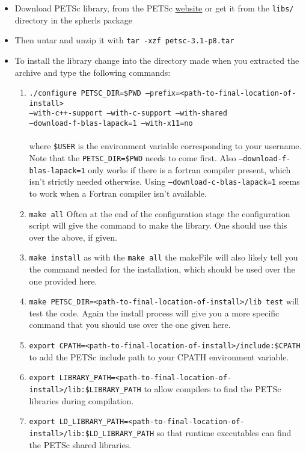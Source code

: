 \documentclass[12pt,a4paper]{book}
\begin{document}
\begin{itemize}
\item Download PETSc library, from the PETSc \href{http://www.mcs.anl.gov/petsc/download/index.html}{website} or get it from the {\tt libs/} directory in the spherls package
\item Then untar and unzip it with {\tt tar -xzf petsc-3.1-p8.tar}
\item To install the library change into the directory made when you extracted the archive and type the following commands:
\begin{enumerate}
\item {\tt ./configure PETSC\_DIR=\$PWD --prefix=<path-to-final-location-of-install> }\\{\tt --with-c++-support --with-c-support --with-shared}\\{\tt --download-f-blas-lapack=1 --with-x11=no}\\ \\ where {\tt \$USER} is the environment variable corresponding to your username.  Note that the {\tt PETSC\_DIR=\$PWD} needs to come first. Also {\tt --download-f-blas-lapack=1} only works if there is a fortran compiler present, which isn't strictly needed otherwise. Using {\tt --download-c-blas-lapack=1} seems to work when a Fortran compiler isn't available.
\item {\tt make all} Often at the end of the configuration stage the configuration script will give the command to make the library. One should use this over the above, if given.
\item {\tt make install} as with the {\tt make all} the makeFile will also likely tell you the command needed for the installation, which should be used over the one provided here.
\item {\tt make PETSC\_DIR=<path-to-final-location-of-install>/lib test} will test the code. Again the install process will give you a more specific command that you should use over the one given here.
\item {\tt export CPATH=<path-to-final-location-of-install>/include:\$CPATH} to add the PETSc include path to your CPATH environment variable.
\item {\tt export LIBRARY\_PATH=<path-to-final-location-of-install>/lib:\$LIBRARY\_PATH} to allow compilers to find the PETSc libraries during compilation.
\item {\tt export LD\_LIBRARY\_PATH=<path-to-final-location-of-install>/lib:\$LD\_LIBRARY\_PATH} so that runtime executables can find the PETSc shared libraries.
\end{enumerate}
\end{itemize}
\end{document}
